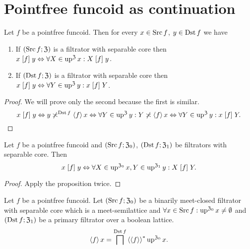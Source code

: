 \section{Pointfree funcoid as continuation}
\begin{prop}
Let $f$ be a pointfree funcoid. Then for every $x\in\operatorname{Src} f$, $y\in\operatorname{Dst} f$
we have
\begin{enumerate}
\item If $(\operatorname{Src} f;\mathfrak{Z})$ is a filtrator with separable core then
$x\mathrel{\left[f\right]}y\Leftrightarrow\forall X\in\operatorname{up}^{\mathfrak{Z}}x:X\mathrel{\left[f\right]}y$.
\item If $(\operatorname{Dst} f;\mathfrak{Z})$ is a filtrator with separable core then
$x\mathrel{\left[f\right]}y\Leftrightarrow\forall Y\in\operatorname{up}^{\mathfrak{Z}}y:x\mathrel{\left[f\right]}Y$.
\end{enumerate}
\end{prop}
\begin{proof}
We will prove only the second because the first is similar.
\[
x\mathrel{\left[f\right]}y\Leftrightarrow y\not\asymp^{\operatorname{Dst} f}\left\langle f\right\rangle x\Leftrightarrow\forall Y\in\operatorname{up}^{\mathfrak{Z}}y:Y\not\asymp\left\langle f\right\rangle x\Leftrightarrow\forall Y\in\operatorname{up}^{\mathfrak{Z}}y:x\mathrel{\left[f\right]}Y.
\]
\end{proof}
\begin{cor}
\label{pf-relatom-both}Let $f$ be a pointfree funcoid and $(\operatorname{Src} f;\mathfrak{Z}_{0})$,
$(\operatorname{Dst} f;\mathfrak{Z}_{1})$ be filtrators with separable core. Then
\[
x\mathrel{\left[f\right]}y\Leftrightarrow\forall X\in\operatorname{up}^{\mathfrak{Z}_{0}}x,Y\in\operatorname{up}^{\mathfrak{Z}_{1}}y:X\mathrel{\left[f\right]}Y.
\]
\end{cor}
\begin{proof}
Apply the proposition twice.\end{proof}
\begin{thm}
\label{pf-supfun-up}Let $f$ be a pointfree funcoid. Let $(\operatorname{Src} f;\mathfrak{Z}_{0})$
be a binarily meet-closed filtrator with separable core which is a
meet-semilattice and $\forall x\in\operatorname{Src} f:\operatorname{up}^{\mathfrak{Z}_{0}}x\neq\emptyset$
and $(\operatorname{Dst} f;\mathfrak{Z}_{1})$ be a primary filtrator over a boolean
lattice.
\[
\left\langle f\right\rangle x=\bigsqcap^{\operatorname{Dst} f}\left\langle \left\langle f\right\rangle\right\rangle ^{\ast}\operatorname{up}^{\mathfrak{Z}_{0}}x.
\]
\end{thm}
